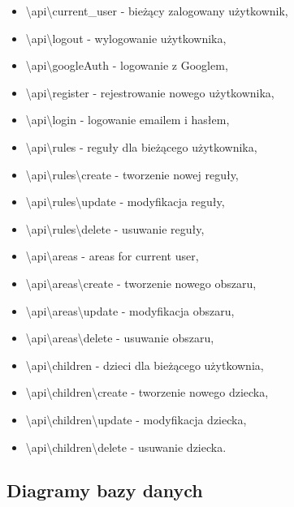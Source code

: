 \documentclass{sprawozdanie-agh}
\begin{document}
			\begin{itemize}
				\item \textbackslash api\textbackslash current\_user - bieżący zalogowany użytkownik,
				\item \textbackslash api\textbackslash logout - wylogowanie użytkownika,
				\item \textbackslash api\textbackslash googleAuth - logowanie z Googlem,
				\item \textbackslash api\textbackslash register - rejestrowanie nowego użytkownika,
				\item \textbackslash api\textbackslash login - logowanie emailem i hasłem,
				\item \textbackslash api\textbackslash rules - reguły dla bieżącego użytkownika,
				\item \textbackslash api\textbackslash rules\textbackslash create - tworzenie nowej reguły,
				\item \textbackslash api\textbackslash rules\textbackslash update - modyfikacja reguły,
				\item \textbackslash api\textbackslash rules\textbackslash delete - usuwanie reguły,
				\item \textbackslash api\textbackslash areas - areas for current user,
				\item \textbackslash api\textbackslash areas\textbackslash create - tworzenie nowego obszaru,
				\item \textbackslash api\textbackslash areas\textbackslash update - modyfikacja obszaru,
				\item \textbackslash api\textbackslash areas\textbackslash delete - usuwanie obszaru,	
				\item \textbackslash api\textbackslash children - dzieci dla bieżącego użytkownia,
				\item \textbackslash api\textbackslash children\textbackslash create - tworzenie nowego dziecka,
				\item \textbackslash api\textbackslash children\textbackslash update - modyfikacja dziecka,
				\item \textbackslash api\textbackslash children\textbackslash delete - usuwanie dziecka.
			\end{itemize}
		
		\subsection{Diagramy bazy danych}
\end{document}
